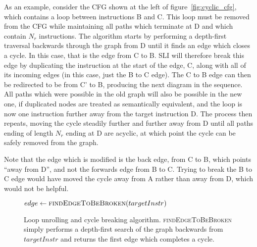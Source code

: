 As an example, consider the CFG shown at the left of
figure~\ref{fig:cyclic_cfg}, which contains a loop between
instructions B and C.  This loop must be removed from the CFG while
maintaining all paths which terminate at D and which contain $N_r$
instructions.  The algorithm starts by performing a depth-first
traversal backwards through the graph from D until it finds an edge
which closes a cycle.  In this case, that is the edge from C to B.
SLI will therefore break this edge by duplicating the instruction at
the start of the edge, C, along with all of its incoming edges (in
this case, just the B to C edge).  The C to B edge can then be
redirected to be from C' to B, producing the next diagram in the
sequence.  All paths which were possible in the old graph will also be
possible in the new one, if duplicated nodes are treated as
semantically equivalent, and the loop is now one instruction further
away from the target instruction D.  The process then repeats, moving
the cycle steadily further and further away from D until all paths
ending of length $N_r$ ending at D are acyclic, at which point the
cycle can be safely removed from the graph.

Note that the edge which is modified is the back edge, from C to B,
which points ``away from D'', and not the forwards edge from B to C.
Trying to break the B to C edge would have moved the cycle away from A
rather than away from D, which would not be helpful.

\begin{figure}
\begin{algorithmic}[1]
     \State $edge \gets \textsc{findEdgeToBeBroken}(targetInstr)$
     \Else
        \EndFor
     \EndIf
  \EndWhile
\end{algorithmic}
\caption{Loop unrolling and cycle breaking algorithm.
  \textsc{findEdgeToBeBroken} simply performs a depth-first search of
  the graph backwards from $targetInstr$ and returns the first edge
  which completes a cycle.}
\label{fig:derive:read:unroll_cycle_break}
\end{figure}

